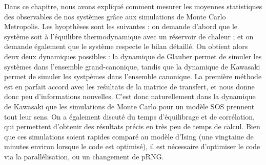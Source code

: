 Dans ce chapitre, nous avons expliqué comment mesurer les moyennes statistiques des observables de nos systèmes grâce aux simulations de Monte Carlo Metropolis. 
Les hyopthèses sont les suivantes : on demande d'abord que le système soit à l'équilibre thermodynamique avec un réservoir de chaleur ; et on demande également que le système respecte le bilan détaillé. On obtient alors deux deux dynamiques possibles : la dynamique de Glauber permet de simuler les systèmes dans l'ensemble grand-canonique, tandis que la dynamique de Kawasaki permet de simuler les systpèmes dans l'ensemble canonique.
La première méthode est en parfait accord avec les reśultats de la matrice de transfert, et nous donne donc peu d'informations nouvelles.  C'est donc naturellement dans la dynamique de Kawasaki que les simulations de Monte Carlo pour un modèle SOS prennent tout leur sens.
On a également discuté du temps d'équilibrage et de corrélation, qui permettent d'obtenir des résultats précis en très peu de temps de calcul. Bien que ces simulations soient rapides comparé au modèle d'Ising (une vingtaine de minutes environ lorsque le code est optimisé), il est nécessaire d'optimiser le code via la parallélisation, ou un changement de pRNG.